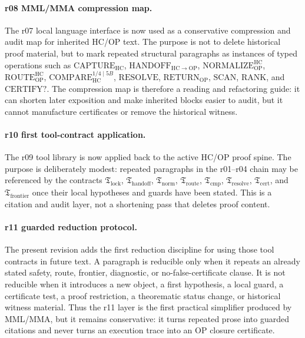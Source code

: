 \paragraph{r08 MML/MMA compression map.}
The r07 local language interface is now used as a conservative compression and audit map for inherited HC/OP text. The purpose is not to delete historical proof material, but to mark repeated structural paragraphs as instances of typed operations such as \(\mathrm{CAPTURE}_{\mathrm{HC}}\), \(\mathrm{HANDOFF}_{\mathrm{HC}\to\mathrm{OP}}\), \(\mathrm{NORMALIZE}_{\mathrm{OP}}^{\mathrm{HC}}\), \(\mathrm{ROUTE}_{\mathrm{OP}}^{\mathrm{HC}}\), \(\mathrm{COMPARE}_{\mathrm{HC}}^{1/4\mid 5B}\), \(\mathrm{RESOLVE}\), \(\mathrm{RETURN}_{\mathrm{OP}}\), \(\mathrm{SCAN}\), \(\mathrm{RANK}\), and \(\mathrm{CERTIFY?}\). The compression map is therefore a reading and refactoring guide: it can shorten later exposition and make inherited blocks easier to audit, but it cannot manufacture certificates or remove the historical witness.

\paragraph{r10 first tool-contract application.}
The r09 tool library is now applied back to the active HC/OP proof spine. The purpose is deliberately modest: repeated paragraphs in the r01--r04 chain may be referenced by the contracts \(\mathfrak T_{\mathrm{lock}}\), \(\mathfrak T_{\mathrm{handoff}}\), \(\mathfrak T_{\mathrm{norm}}\), \(\mathfrak T_{\mathrm{route}}\), \(\mathfrak T_{\mathrm{cmp}}\), \(\mathfrak T_{\mathrm{resolve}}\), \(\mathfrak T_{\mathrm{cert}}\), and \(\mathfrak T_{\mathrm{frontier}}\) once their local hypotheses and guards have been stated. This is a citation and audit layer, not a shortening pass that deletes proof content.


\paragraph{r11 guarded reduction protocol.}
The present revision adds the first reduction discipline for using those tool contracts in future text. A paragraph is reducible only when it repeats an already stated safety, route, frontier, diagnostic, or no-false-certificate clause. It is not reducible when it introduces a new object, a first hypothesis, a local guard, a certificate test, a proof restriction, a theorematic status change, or historical witness material. Thus the r11 layer is the first practical simplifier produced by MML/MMA, but it remains conservative: it turns repeated prose into guarded citations and never turns an execution trace into an OP closure certificate.


